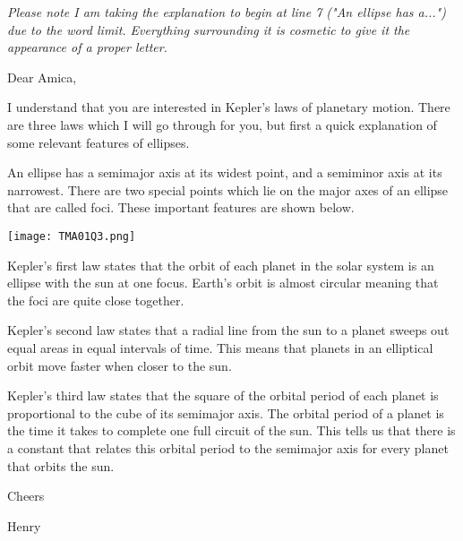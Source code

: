 \documentclass[a4paper,12pt]{article}
\numberwithin{equation}{section}
\begin{document}
\begin{question}
\textit{Please note I am taking the explanation to begin at line 7 ("An ellipse has a...") due to the word limit. Everything surrounding it is cosmetic to give it the appearance of a proper letter.}

Dear Amica,

\qquad I understand that you are interested in Kepler's laws of planetary motion. There are three laws which I will go through for you, but first a quick explanation of some relevant features of ellipses.

\qquad An ellipse has a semimajor axis at its widest point, and a semiminor axis at its narrowest. There are two special points which lie on the major axes of an ellipse that are called foci. These important features are shown below.

\begin{center}
\texttt{[image: TMA01Q3.png]}
\end{center}
\qquad Kepler's first law states that the orbit of each planet in the solar system is an ellipse with the sun at one focus. Earth’s orbit is almost circular meaning that the foci are quite close together.

\qquad Kepler’s second law states that a radial line from the sun to a planet sweeps out equal areas in equal intervals of time. This means that planets in an elliptical orbit move faster when closer to the sun.

\qquad Kepler’s third law states that the square of the orbital period of each planet is proportional to the cube of its semimajor axis. The orbital period of a planet is the time it takes to complete one full circuit of the sun. This tells us that there is a constant that relates this orbital period to the semimajor axis for every planet that orbits the sun.

Cheers

Henry

\end{question}
\end{document}
